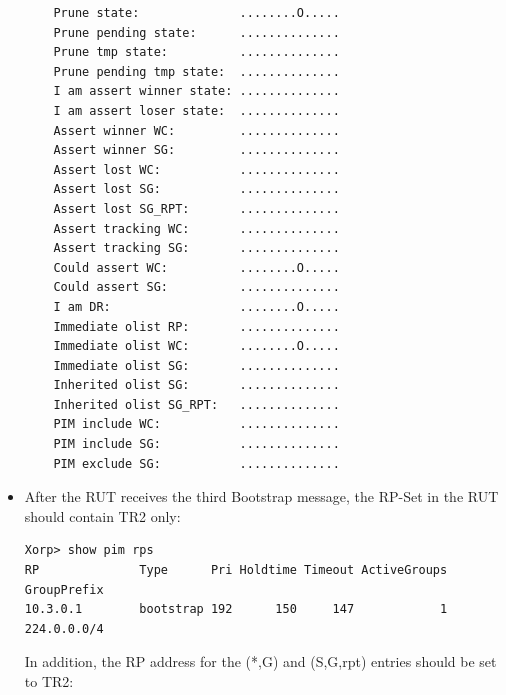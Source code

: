 \documentclass[11pt]{report}
\begin{document}
\begin{itemize}
\begin{verbatim}
    Prune state:              ........O.....
    Prune pending state:      ..............
    Prune tmp state:          ..............
    Prune pending tmp state:  ..............
    I am assert winner state: ..............
    I am assert loser state:  ..............
    Assert winner WC:         ..............
    Assert winner SG:         ..............
    Assert lost WC:           ..............
    Assert lost SG:           ..............
    Assert lost SG_RPT:       ..............
    Assert tracking WC:       ..............
    Assert tracking SG:       ..............
    Could assert WC:          ........O.....
    Could assert SG:          ..............
    I am DR:                  ........O.....
    Immediate olist RP:       ..............
    Immediate olist WC:       ........O.....
    Immediate olist SG:       ..............
    Inherited olist SG:       ..............
    Inherited olist SG_RPT:   ..............
    PIM include WC:           ..............
    PIM include SG:           ..............
    PIM exclude SG:           ..............
\end{verbatim}

  \item After the RUT receives the third Bootstrap message, the RP-Set in the
  RUT should contain TR2 only:

\begin{verbatim}
Xorp> show pim rps 
RP              Type      Pri Holdtime Timeout ActiveGroups GroupPrefix       
10.3.0.1        bootstrap 192      150     147            1 224.0.0.0/4       
\end{verbatim}

  In addition, the RP address for the (*,G) and (S,G,rpt) entries should be
  set to TR2:


\end{itemize}
\end{document}
